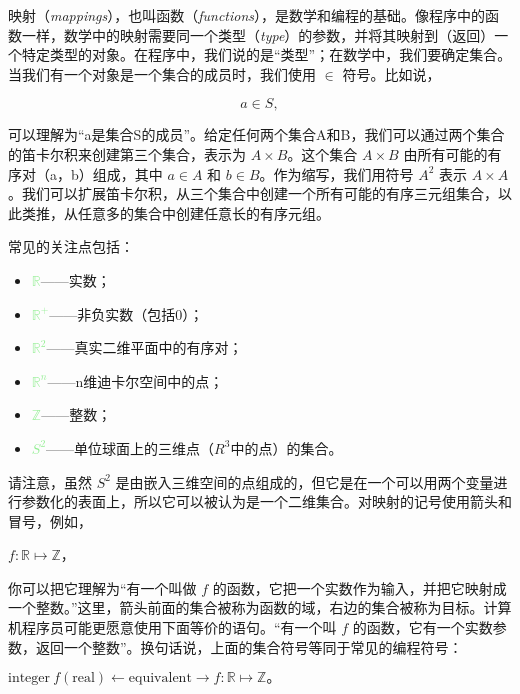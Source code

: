 \documentclass[lang=cn,12pt]{elegantbook}
\begin{document}
映射（\textit{mappings}），也叫函数（\textit{functions}），是数学和编程的基础。像程序中的函数一样，数学中的映射需要同一个类型（\textit{type}）的参数，并将其映射到（返回）一个特定类型的对象。在程序中，我们说的是“类型”；在数学中，我们要确定集合。当我们有一个对象是一个集合的成员时，我们使用 $\in$ 符号。比如说，

$$a \in S,$$ 

可以理解为“a是集合S的成员”。给定任何两个集合A和B，我们可以通过两个集合的笛卡尔积来创建第三个集合，表示为 $A \times B$。这个集合 $A \times B$ 由所有可能的有序对（a，b）组成，其中 $a \in A$ 和 $b \in B$。作为缩写，我们用符号 $A^2$ 表示 $A \times A$。我们可以扩展笛卡尔积，从三个集合中创建一个所有可能的有序三元组集合，以此类推，从任意多的集合中创建任意长的有序元组。

常见的关注点包括：

\begin{itemize}
  \item \textcolor{lightgreen}{$\mathbb{R}$}——实数；
  \item \textcolor{lightgreen}{$\mathbb{R^+}$}——非负实数（包括0）；
  \item \textcolor{lightgreen}{$\mathbb{R}^2$}——真实二维平面中的有序对；
  \item \textcolor{lightgreen}{$\mathbb{R}^n$}——n维迪卡尔空间中的点；
  \item \textcolor{lightgreen}{$\mathbb{Z}$}——整数；
  \item \textcolor{lightgreen}{$S^2$}——单位球面上的三维点（$R^3$中的点）的集合。
\end{itemize}

请注意，虽然 $S^2$ 是由嵌入三维空间的点组成的，但它是在一个可以用两个变量进行参数化的表面上，所以它可以被认为是一个二维集合。对映射的记号使用箭头和冒号，例如，
\begin{center}
  $f : \mathbb{R} \mapsto \mathbb{Z}$，
\end{center}

你可以把它理解为“有一个叫做 $f$ 的函数，它把一个实数作为输入，并把它映射成一个整数。”这里，箭头前面的集合被称为函数的域，右边的集合被称为目标。计算机程序员可能更愿意使用下面等价的语句。“有一个叫 $f$ 的函数，它有一个实数参数，返回一个整数”。换句话说，上面的集合符号等同于常见的编程符号：

\begin{center}
  $\text{integer} \  f(\text{real}) \leftarrow \text{equivalent} \rightarrow f : \mathbb{R} \mapsto \mathbb{Z}。$
\end{center}
\end{document}
